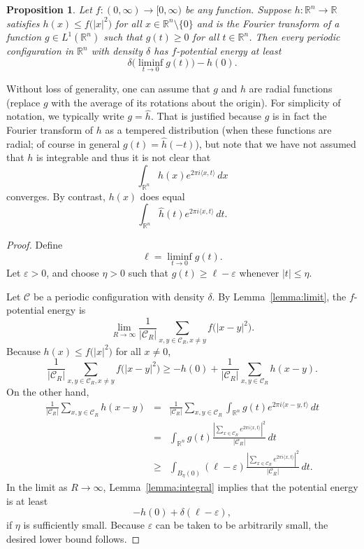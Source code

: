 \documentclass{jams-l}
\theoremstyle{plain}
\newtheorem{proposition}[theorem]{Proposition}
\numberwithin{theorem}{section}
\theoremstyle{definition}
\numberwithin{equation}{section}
\newcommand{\R}{{\mathbb R}}
\newcommand{\co}{\colon}
\begin{document}
\begin{proposition} \label{prop:Euclidean}
Let $f \co (0,\infty) \to [0,\infty)$ be any function. Suppose $h
\co \R^n \to \R$ satisfies $h(x) \le f\big(|x|^2\big)$ for all $x
\in \R^n \setminus \{0\}$ and is the Fourier transform of a
function $g \in L^1(\R^n)$ such that $g(t) \ge 0$ for all $t \in
\R^n$. Then every periodic configuration in $\R^n$ with density
$\delta$ has $f$-potential energy at least
$$
\delta \big(\liminf_{t \to 0} g(t)\big)-h(0).
$$
\end{proposition}

Without loss of generality, one can assume that $g$ and $h$ are
radial functions (replace $g$ with the average of its rotations
about the origin). For simplicity of notation, we typically write
$g = \widehat{h}$. That is justified because $g$ is in fact the
Fourier transform of $h$ as a tempered distribution (when these
functions are radial; of course in general $g(t) =
\widehat{h}(-t)$), but note that we have not assumed that $h$ is
integrable and thus it is not clear that
$$
\int_{\R^n} h(x) e^{2\pi i \langle x,t \rangle} \, dx
$$
converges.  By contrast, $h(x)$ does equal
$$
\int_{\R^n} \widehat{h}(t) e^{2\pi i \langle x,t \rangle} \, dt.
$$

\begin{proof}
Define
$$
\ell = \liminf_{t \to 0} g(t).
$$
Let $\varepsilon>0$, and choose $\eta>0$ such that $g(t) \ge
\ell-\varepsilon$ whenever $|t| \le \eta$.

Let $\mathcal{C}$ be a periodic configuration with density
$\delta$.  By Lemma~\ref{lemma:limit}, the $f$-potential energy is
$$
\lim_{R \to \infty} \frac{1}{|\mathcal{C}_R|} \sum_{x,y \in
\mathcal{C}_R, x \ne y} f\big(|x-y|^2\big).
$$
Because $h(x) \le f\big(|x|^2\big)$ for all $x \ne 0$,
$$
\frac{1}{|\mathcal{C}_R|} \sum_{x,y \in \mathcal{C}_R, x \ne y}
f\big(|x-y|^2\big) \ge -h(0) + \frac{1}{|\mathcal{C}_R|} \sum_{x,y
\in \mathcal{C}_R} h(x-y).
$$
On the other hand,
\begin{eqnarray*}
\frac{1}{|\mathcal{C}_R|} \sum_{x,y \in \mathcal{C}_R} h(x-y) &=&
\frac{1}{|\mathcal{C}_R|} \sum_{x,y \in \mathcal{C}_R} \int_{\R^n}
g(t) e^{2\pi i \langle x-y, t \rangle} \, dt\\
&=& \int_{\R^n} g(t) \frac{\left|\sum_{x \in \mathcal{C}_R}
e^{2\pi i \langle x,t
\rangle} \right|^2}{|\mathcal{C}_R|} \, dt\\
&\ge& \int_{B_\eta(0)} (\ell-\varepsilon) \frac{\left|\sum_{x \in
\mathcal{C}_R} e^{2\pi i \langle x,t \rangle}
\right|^2}{|\mathcal{C}_R|} \, dt.
\end{eqnarray*}
In the limit as $R \to \infty$, Lemma~\ref{lemma:integral} implies
that the potential energy is at least
$$
-h(0) + \delta(\ell - \varepsilon),
$$
if $\eta$ is sufficiently small.  Because $\varepsilon$ can be
taken to be arbitrarily small, the desired lower bound follows.
\end{proof}
\end{document}
